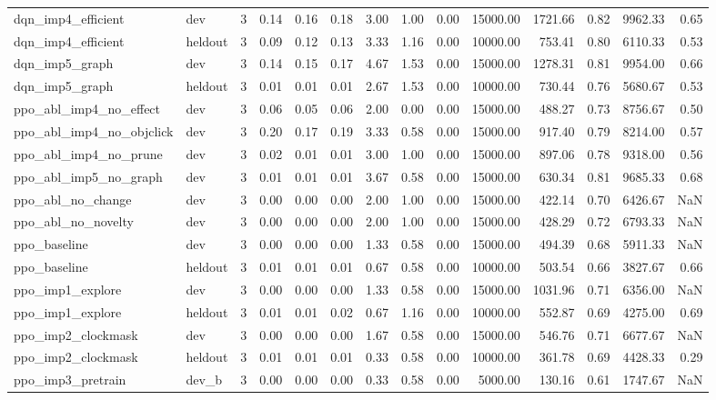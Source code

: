 \begin{tabular}{llrrrrrrrrrrrr}
dqn_imp4_efficient & dev & 3 & 0.14 & 0.16 & 0.18 & 3.00 & 1.00 & 0.00 & 15000.00 & 1721.66 & 0.82 & 9962.33 & 0.65 \\
dqn_imp4_efficient & heldout & 3 & 0.09 & 0.12 & 0.13 & 3.33 & 1.16 & 0.00 & 10000.00 & 753.41 & 0.80 & 6110.33 & 0.53 \\
dqn_imp5_graph & dev & 3 & 0.14 & 0.15 & 0.17 & 4.67 & 1.53 & 0.00 & 15000.00 & 1278.31 & 0.81 & 9954.00 & 0.66 \\
dqn_imp5_graph & heldout & 3 & 0.01 & 0.01 & 0.01 & 2.67 & 1.53 & 0.00 & 10000.00 & 730.44 & 0.76 & 5680.67 & 0.53 \\
ppo_abl_imp4_no_effect & dev & 3 & 0.06 & 0.05 & 0.06 & 2.00 & 0.00 & 0.00 & 15000.00 & 488.27 & 0.73 & 8756.67 & 0.50 \\
ppo_abl_imp4_no_objclick & dev & 3 & 0.20 & 0.17 & 0.19 & 3.33 & 0.58 & 0.00 & 15000.00 & 917.40 & 0.79 & 8214.00 & 0.57 \\
ppo_abl_imp4_no_prune & dev & 3 & 0.02 & 0.01 & 0.01 & 3.00 & 1.00 & 0.00 & 15000.00 & 897.06 & 0.78 & 9318.00 & 0.56 \\
ppo_abl_imp5_no_graph & dev & 3 & 0.01 & 0.01 & 0.01 & 3.67 & 0.58 & 0.00 & 15000.00 & 630.34 & 0.81 & 9685.33 & 0.68 \\
ppo_abl_no_change & dev & 3 & 0.00 & 0.00 & 0.00 & 2.00 & 1.00 & 0.00 & 15000.00 & 422.14 & 0.70 & 6426.67 & NaN \\
ppo_abl_no_novelty & dev & 3 & 0.00 & 0.00 & 0.00 & 2.00 & 1.00 & 0.00 & 15000.00 & 428.29 & 0.72 & 6793.33 & NaN \\
ppo_baseline & dev & 3 & 0.00 & 0.00 & 0.00 & 1.33 & 0.58 & 0.00 & 15000.00 & 494.39 & 0.68 & 5911.33 & NaN \\
ppo_baseline & heldout & 3 & 0.01 & 0.01 & 0.01 & 0.67 & 0.58 & 0.00 & 10000.00 & 503.54 & 0.66 & 3827.67 & 0.66 \\
ppo_imp1_explore & dev & 3 & 0.00 & 0.00 & 0.00 & 1.33 & 0.58 & 0.00 & 15000.00 & 1031.96 & 0.71 & 6356.00 & NaN \\
ppo_imp1_explore & heldout & 3 & 0.01 & 0.01 & 0.02 & 0.67 & 1.16 & 0.00 & 10000.00 & 552.87 & 0.69 & 4275.00 & 0.69 \\
ppo_imp2_clockmask & dev & 3 & 0.00 & 0.00 & 0.00 & 1.67 & 0.58 & 0.00 & 15000.00 & 546.76 & 0.71 & 6677.67 & NaN \\
ppo_imp2_clockmask & heldout & 3 & 0.01 & 0.01 & 0.01 & 0.33 & 0.58 & 0.00 & 10000.00 & 361.78 & 0.69 & 4428.33 & 0.29 \\
ppo_imp3_pretrain & dev_b & 3 & 0.00 & 0.00 & 0.00 & 0.33 & 0.58 & 0.00 & 5000.00 & 130.16 & 0.61 & 1747.67 & NaN \\

\end{tabular}
